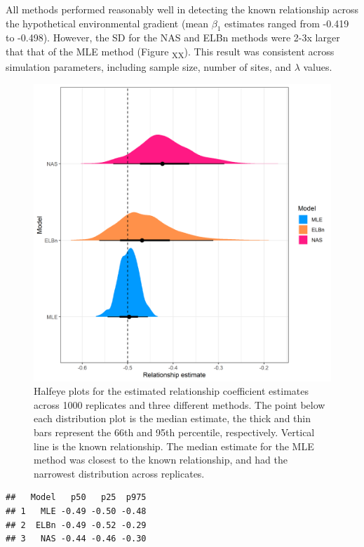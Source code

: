 \documentclass[
]{article}
\begin{document}
All methods performed reasonably well in detecting the known
relationship across the hypothetical environmental gradient (mean
\(\beta_1\) estimates ranged from -0.419 to -0.498). However, the SD for
the NAS and ELBn methods were 2-3x larger that that of the MLE method
(Figure \textsubscript{XX}). This result was consistent across
simulation parameters, including sample size, number of sites, and
\(\lambda\) values.

\newpage

\begin{figure}
\centering
\includegraphics{figures/PLB_sim_relationship_density.png}
\caption{Halfeye plots for the estimated relationship coefficient
estimates across 1000 replicates and three different methods. The point
below each distribution plot is the median estimate, the thick and thin
bars represent the 66th and 95th percentile, respectively. Vertical line
is the known relationship. The median estimate for the MLE method was
closest to the known relationship, and had the narrowest distribution
across replicates.}
\end{figure}

\newpage

\begin{verbatim}
##   Model   p50   p25  p975
## 1   MLE -0.49 -0.50 -0.48
## 2  ELBn -0.49 -0.52 -0.29
## 3   NAS -0.44 -0.46 -0.30
\end{verbatim}
\end{document}
